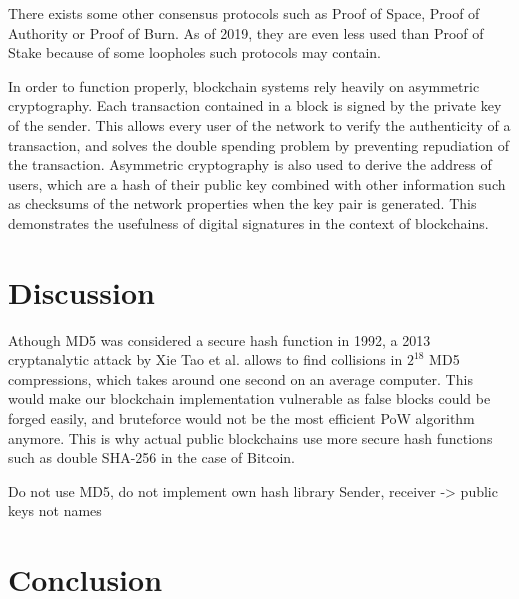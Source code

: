 \documentclass{article}
\begin{document}
\bigskip

There exists some other consensus protocols such as Proof of Space, Proof of Authority or Proof of Burn. As of 2019, they are even less used than Proof of Stake because of some loopholes such protocols may contain.

\bigskip

In order to function properly, blockchain systems rely heavily on asymmetric cryptography. Each transaction contained in a block is signed by the private key of the sender. This allows every user of the network to verify the authenticity of a transaction, and solves the double spending problem by preventing repudiation of the transaction. Asymmetric cryptography is also used to derive the address of users, which are a hash of their public key combined with other information such as checksums of the network properties when the key pair is generated. This demonstrates the usefulness of digital signatures in the context of blockchains.


\section{Discussion}

Athough MD5 was considered a secure hash function in 1992, a 2013 cryptanalytic attack by Xie Tao et al.\cite{xie2013md5} allows to find collisions in $2^{18}$ MD5 compressions, which takes around one second on an average computer. This would make our blockchain implementation vulnerable as false blocks could be forged easily, and bruteforce would not be the most efficient PoW algorithm anymore. This is why actual public blockchains use more secure hash functions such as double SHA-256 in the case of Bitcoin.

Do not use MD5, do not implement own hash library
Sender, receiver -> public keys not names

\section{Conclusion}


\bigskip




\end{document}

